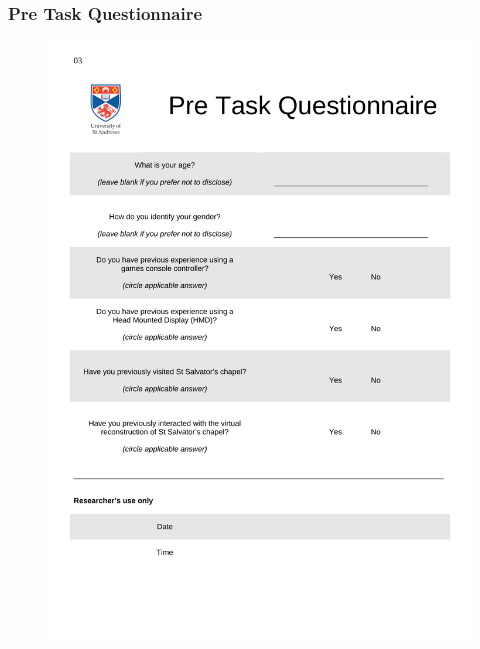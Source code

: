 \subsubsection{Pre Task Questionnaire}
\label{pre_task_questionnaire}
\begin{figure}[h]
	\begin{center}
		\includegraphics[width=0.7\linewidth]{PDFs/Pre_Task_Questionnaire.pdf}
	\end{center}
\end{figure}

